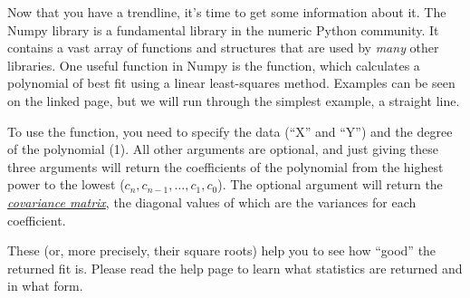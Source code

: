 \documentclass[nobib,nofonts,nols,nohyper]{tufte-handout}
\begin{document}
Now that you have a trendline, it's time to get some information about it.
The Numpy library is a fundamental library in the numeric Python community.
It contains a vast array of functions and structures that are used by \emph{many} other libraries.
One useful function in Numpy is the \href{https://numpy.org/doc/stable/reference/generated/numpy.polyfit.html}{} function, which calculates a polynomial of best fit using a linear least-squares method.
Examples can be seen on the linked page, but we will run through the simplest example, a straight line.

To use the  function, you need to specify the data (``X'' and ``Y'') and the degree of the polynomial (\num{1}).
All other arguments are optional, and just giving these three arguments will return the coefficients of the polynomial from the highest power to the lowest (\( c_n, c_{n-1}, \ldots, c_1, c_0 \)).
The optional argument  will return the \href{https://en.wikipedia.org/wiki/Covariance_matrix}{\emph{covariance matrix}}, the diagonal values of which are the variances for each coefficient.

These (or, more precisely, their square roots) help you to see how ``good'' the returned fit is.
Please read the help page to learn what statistics are returned and in what form.
\end{document}

